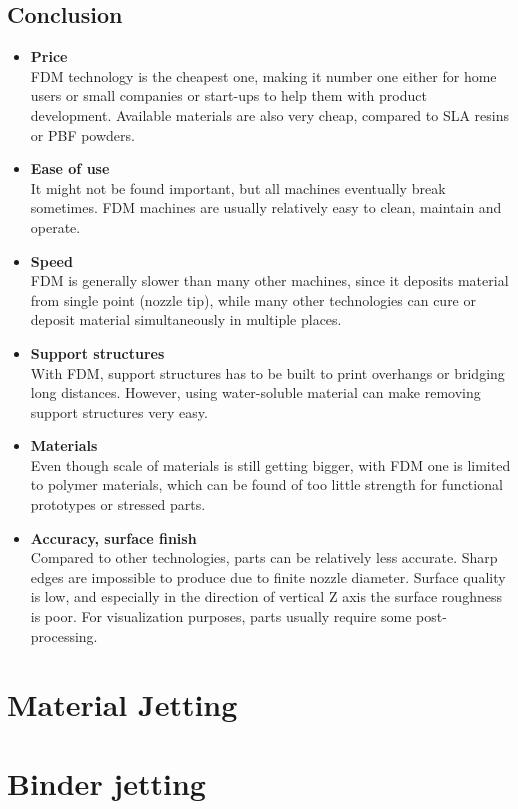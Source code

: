 \documentclass[a4paper, twoside, 11pt]{report}
\newcommand\pro{\item[$+$]}
\newcommand\con{\item[$-$]}
\begin{document}
\section{Conclusion}
\begin{itemize}
\pro \textbf{Price}\\
FDM technology is the cheapest one, making it number one either for home users or small companies or start-ups to help them with product development. Available materials are also very cheap, compared to SLA resins or PBF powders.

\pro \textbf{Ease of use}\\
It might not be found important, but all machines eventually break sometimes. FDM machines are usually relatively easy to clean, maintain and operate.
\\[10pt]



\con \textbf{Speed}\\
FDM is generally slower than many other machines, since it deposits material from single point (nozzle tip), while many other technologies can cure or deposit material simultaneously in multiple places.

\con \textbf{Support structures}\\
With FDM, support structures has to be built to print overhangs or bridging long distances. However, using water-soluble material can make removing support structures very easy.

\con \textbf{Materials}\\
Even though scale of materials is still getting bigger, with FDM one is limited to polymer materials, which can be found of too little strength for functional prototypes or stressed parts.

\con \textbf{Accuracy, surface finish}\\
Compared to other technologies, parts can be relatively less accurate. Sharp edges are impossible to produce due to finite nozzle diameter. Surface quality is low, and especially in the direction of vertical Z axis the surface roughness is poor. For visualization purposes, parts usually require some post-processing.
\end{itemize}

\chapter{Material Jetting}




\chapter{Binder jetting}
\end{document}
